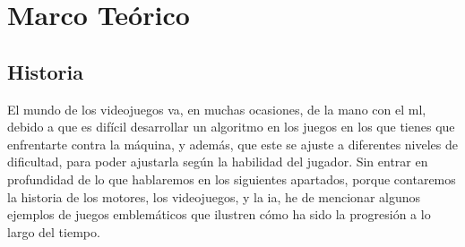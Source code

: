 
\chapter{Marco Teórico}
\label{marcoteorico}

\section{Historia}
El mundo de los videojuegos va, en muchas ocasiones, de la mano con el \gls{ml}, debido a que es difícil desarrollar un algoritmo en los juegos en los que tienes que enfrentarte contra la máquina, y además, que este se ajuste a diferentes niveles de dificultad, para poder ajustarla según la habilidad del jugador. Sin entrar en profundidad de lo que hablaremos en los siguientes apartados, porque contaremos la historia de los motores, los videojuegos, y la \gls{ia}, he de mencionar algunos ejemplos de juegos emblemáticos que ilustren cómo ha sido la progresión a lo largo del tiempo. 
